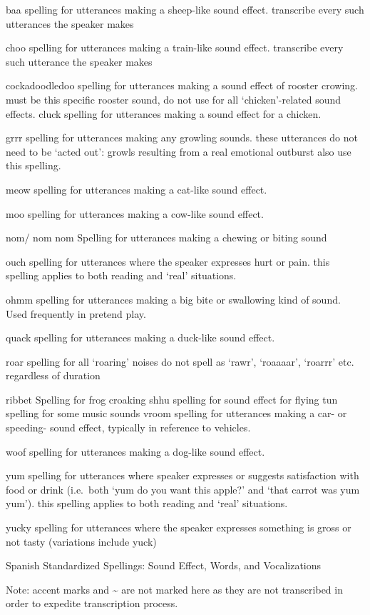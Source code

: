 \documentclass[
]{book}
\begin{document}
baa
spelling for utterances making a sheep-like sound effect. transcribe every such utterances the speaker makes

choo
spelling for utterances making a train-like sound effect. transcribe every such utterance the speaker makes

cockadoodledoo
spelling for utterances making a sound effect of rooster crowing. must be this specific rooster sound, do not use for all `chicken'-related sound effects.
cluck
spelling for utterances making a sound effect for a chicken.

grrr
spelling for utterances making any growling sounds. these utterances do not need to be `acted out': growls resulting from a real emotional outburst also use this spelling.

meow
spelling for utterances making a cat-like sound effect.

moo
spelling for utterances making a cow-like sound effect.

nom/ nom nom
Spelling for utterances making a chewing or biting sound

ouch
spelling for utterances where the speaker expresses hurt or pain. this spelling applies to both reading and `real' situations.

ohmm
spelling for utterances making a big bite or swallowing kind of sound. Used frequently in pretend play.

quack
spelling for utterances making a duck-like sound effect.

roar
spelling for all `roaring' noises
do not spell as `rawr', `roaaaar', `roarrr' etc. regardless of duration

ribbet
Spelling for frog croaking
shhu
spelling for sound effect for flying
tun
spelling for some music sounds
vroom
spelling for utterances making a car- or speeding- sound effect, typically in reference to vehicles.

woof
spelling for utterances making a dog-like sound effect.

yum
spelling for utterances where speaker expresses or suggests satisfaction with food or drink (i.e.~both `yum do you want this apple?' and `that carrot was yum yum'). this spelling applies to both reading and `real' situations.

yucky
spelling for utterances where the speaker expresses something is gross or not tasty (variations include yuck)

Spanish Standardized Spellings: Sound Effect, Words, and Vocalizations

Note: accent marks and \textasciitilde{} are not marked here as they are not transcribed in order to expedite transcription process.
\end{document}
